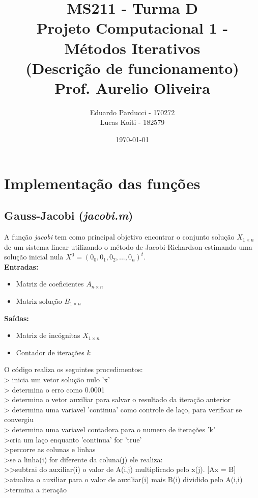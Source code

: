 \documentclass{article}
\title{
    MS211 - Turma D\\
    \large Projeto Computacional 1 - Métodos Iterativos\\
    \large (Descrição de funcionamento)\\
    \large Prof. Aurelio Oliveira
}
\author{Eduardo Parducci - 170272\\Lucas Koiti      - 182579\\}
\date{\today}
\begin{document}
    \maketitle
    \newpage
    \newpage

    \section{Implementação das funções}
        \subsection{Gauss-Jacobi (\textit{jacobi.m})}
            A função \textit{jacobi} tem como principal objetivo encontrar o conjunto solução $X_{1 \times n}$ de um
            sistema linear utilizando o método de Jacobi-Richardson estimando uma solução inicial nula
            $X^0 = (0_{0} , 0_{1}, 0_{2},..., 0_{n})^t$.\\

            \textbf{Entradas:}
                \begin{itemize}
                  \item Matriz de coeficientes $A_{n \times n}$
                  \item Matriz solução $B_{1 \times n}$
                \end{itemize}
            \textbf{Saídas:}
                \begin{itemize}
                  \item Matriz de incógnitas $X_{1 \times n}$
                  \item Contador de iterações $k$
                \end{itemize}

            O código realiza os seguintes procedimentos:\\
            > inicia um vetor solução nulo 'x'\\
            > determina o erro como 0.0001\\
            > determina o vetor auxiliar para salvar o resultado da iteração anterior\\
            > determina uma variavel 'continua' como controle de laço, para verificar se convergiu\\
            > determina uma variavel contadora para o numero de iterações 'k'\\

            >cria um laço enquanto 'continua' for 'true'\\
              >percorre as colunas e linhas\\
                >se a linha(i) for diferente da coluna(j) ele realiza:\\
                  >>subtrai do auxiliar(i) o valor de A(i,j) multiplicado pelo x(j). [Ax = B]\\
                >atualiza o auxiliar para o valor de auxiliar(i) mais B(i) dividido pelo A(i,i)\\
              >termina a iteração\\
\end{document}
